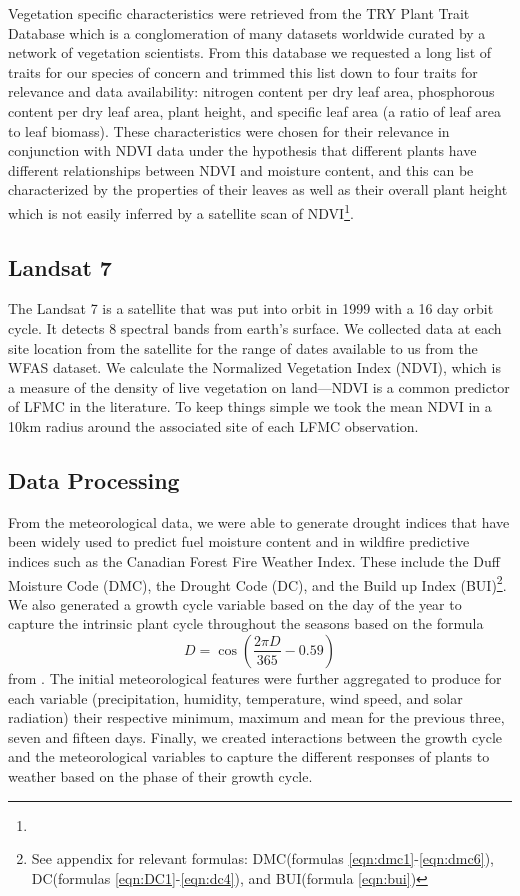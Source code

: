 \documentclass[twocolumn,10pt]{article}
\begin{document}
Vegetation specific characteristics were retrieved from the TRY Plant Trait Database which is a conglomeration of many datasets worldwide curated by a network of vegetation scientists. From this database we requested a long list of traits for our species of concern and trimmed this list down to four traits for relevance and data availability: nitrogen content per dry leaf area, phosphorous content per dry leaf area, plant height, and specific leaf area (a ratio of leaf area to leaf biomass). These characteristics were chosen for their relevance in conjunction with NDVI data under the hypothesis that different plants have different relationships between NDVI and moisture content, and this can be characterized by the properties of their leaves as well as their overall plant height which is not easily inferred by a satellite scan of NDVI\footnote{}. \\

\subsection{Landsat 7}

The Landsat 7 is a satellite that was put into orbit in 1999 with a 16 day orbit cycle. It detects 8 spectral bands from earth's surface.
We collected data at each site location from the satellite for the range of dates available to us from the WFAS dataset. %
We calculate the Normalized Vegetation Index (NDVI), which is a measure of the density of live vegetation on land---NDVI is a common predictor of LFMC in the literature.
To keep things simple we took the mean NDVI in a 10km radius around the associated site of each LFMC observation.

\subsection{Data Processing}
From the meteorological data, we were able to generate drought indices that have been widely used to predict fuel moisture content and in wildfire predictive indices such as the Canadian Forest Fire Weather Index. These include the Duff Moisture Code (DMC), the Drought Code (DC), and the Build up Index (BUI)\footnote{See appendix for relevant formulas: DMC(formulas \ref{eqn:dmc1}-\ref{eqn:dmc6}), DC(formulas \ref{eqn:DC1}-\ref{eqn:dc4}), and BUI(formula \ref{eqn:bui})}. We also generated a growth cycle variable based on the day of the year to capture the intrinsic plant cycle throughout the seasons based on the formula 
\[
    D = \cos\left(\frac{2\pi D}{365} - 0.59\right)
\]
from \citep{castro2003}.  The initial meteorological features were further aggregated to produce for each variable (precipitation, humidity, temperature, wind speed, and solar radiation) their respective minimum, maximum and mean for the previous three, seven and fifteen days. Finally, we created interactions between the growth cycle and the meteorological variables to capture the different responses of plants to weather based on the phase of their growth cycle.\\
\end{document}
